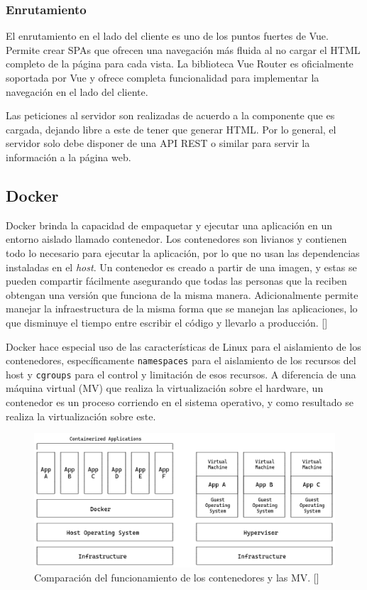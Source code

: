 \subsubsection{Enrutamiento} 

El enrutamiento en el lado del cliente es uno de los puntos fuertes de Vue. Permite crear SPAs que ofrecen una navegación más fluida al no cargar el HTML completo de la página para cada vista. La biblioteca Vue Router es oficialmente soportada por Vue y ofrece completa funcionalidad para implementar la navegación en el lado del cliente.

Las peticiones al servidor son realizadas de acuerdo a la componente que es cargada, dejando libre a este de tener que generar HTML. Por lo general, el servidor solo debe disponer de una API REST o similar para servir la información a la página web.

\subsection{Docker}\label{sec:docker}

Docker brinda la capacidad de empaquetar y ejecutar una aplicación en un entorno aislado llamado contenedor. Los contenedores son livianos y contienen todo lo necesario para ejecutar la aplicación, por lo que no usan las dependencias instaladas en el \textit{host}. Un contenedor es creado a partir de una imagen, y estas se pueden compartir fácilmente asegurando que todas las personas que la reciben obtengan una versión que funciona de la misma manera. Adicionalmente permite manejar la infraestructura de la misma forma que se manejan las aplicaciones, lo que disminuye el tiempo entre escribir el código y llevarlo a producción. [\cite{docker-docs}]

Docker hace especial uso de las características de Linux para el aislamiento de los contenedores, específicamente \verb|namespaces| para el aislamiento de los recursos del host y \verb|cgroups| para el control y limitación de esos recursos. A diferencia de una máquina virtual (MV) que realiza la virtualización sobre el hardware, un contenedor es un proceso corriendo en el sistema operativo, y como resultado se realiza la virtualización sobre este.

\begin{figure}[!ht]
    \centering
    \includegraphics[width=\linewidth]{draws/cont-vs-vm.png}
    \caption{Comparación del funcionamiento de los contenedores y las MV. [\cite{docker-containers}]}
\end{figure}


